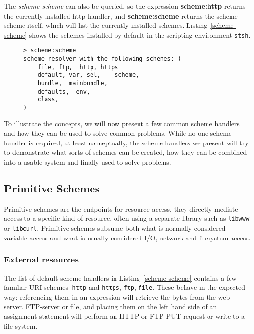\documentclass[preprint,authoryear]{llncs}
\begin{document}
The \emph{scheme scheme} can also be queried,
so the expression {\bf scheme:http} returns the currently installed http handler, and 
{\bf scheme:scheme} returns the scheme scheme itself, which will list the currently
installed schemes.  Listing~\ref{scheme-scheme} shows the schemes installed by
default in the scripting environment {\tt stsh}.

\begin{figure}[htbp]
\begin{lstlisting}[style=L,label=scheme-scheme,caption=List of schemes via scheme:scheme.]
> scheme:scheme 
scheme-resolver with the following schemes: (
    file, ftp,  http, https
    default, var, sel,    scheme,
    bundle,  mainbundle,
    defaults,  env,
    class,
)
\end{lstlisting}
\end{figure}

To illustrate the concepts, we will now present a few common scheme handlers and how they can be
used to solve common problems.  While no one scheme handler is required, at least conceptually,
the scheme handlers we present will try to demonstrate what sorts of schemes can be created,
how they can be combined into a usable system and finally used to solve problems.

\subsection{Primitive Schemes}
\label{primitiveSchemes}

Primitive schemes are the endpoints for resource access, they directly
mediate access to a specific kind of resource, often using a separate
library such as {\tt libwww} or {\tt libcurl}.  Primitive schemes
subsume both what is normally considered variable access and 
what is usually considered I/O, network and filesystem access.


\subsubsection{External resources}
\label{externalResources}

The list of default scheme-handlers in Listing~\ref{scheme-scheme} contains a few familiar URI schemes:
{\tt http} and {\tt https}, {\tt ftp}, {\tt file}.   These behave in the expected way:   referencing them in an expression will
retrieve the bytes from the web-server, FTP-server or file, and placing them on the left hand side of
an assignment statement will perform an HTTP or FTP PUT request or write to a file system. 
 
\end{document}
